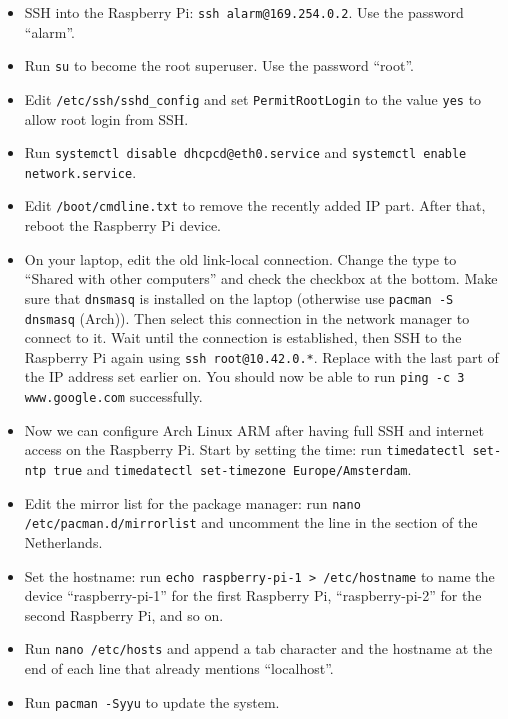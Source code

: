 \documentclass{article}
\newcommand{\arch}{{\color{red} (Arch)}}
\begin{document}
\begin{itemize}
          {\tt ifconfig} when you activate the connection. This is when the 
          connection is established.
    \item SSH into the Raspberry Pi: {\tt ssh alarm@169.254.0.2}. Use the 
          password ``alarm''.
    \item Run {\tt su} to become the root superuser. Use the password ``root''.
    \item Edit {\tt /etc/ssh/sshd\_config} and set {\tt PermitRootLogin} to the 
          value {\tt yes} to allow root login from SSH\@.
    \item Run {\tt systemctl disable dhcpcd@eth0.service} and {\tt systemctl 
          enable network.service}.
    \item Edit {\tt /boot/cmdline.txt} to remove the recently added IP part. 
          After that, reboot the Raspberry Pi device.
    \item On your laptop, edit the old link-local connection. Change the type 
          to ``Shared with other computers'' and check the checkbox at the 
          bottom. Make sure that {\tt dnsmasq} is installed on the laptop 
          (otherwise use {\tt pacman -S dnsmasq} \arch{}). Then select this 
          connection in the network manager to connect to it. Wait until the 
          connection is established, then SSH to the Raspberry Pi again using 
          {\tt ssh root@10.42.0.*}. Replace {\tt *} with the last part of the 
          IP address set earlier on. You should now be able to run {\tt ping -c 
          3 www.google.com} successfully.
    \item Now we can configure Arch Linux ARM after having full SSH and 
          internet access on the Raspberry Pi. Start by setting the time: run 
          {\tt timedatectl set-ntp true} and {\tt timedatectl set-timezone 
          Europe/Amsterdam}.
    \item Edit the mirror list for the package manager: run {\tt nano 
          /etc/pacman.d/mirrorlist} and uncomment the line in the section of 
          the Netherlands.
    \item Set the hostname: run {\tt echo raspberry-pi-1 > /etc/hostname} to 
          name the device ``raspberry-pi-1'' for the first Raspberry Pi, 
          ``raspberry-pi-2'' for the second Raspberry Pi, and so on.
    \item Run {\tt nano /etc/hosts} and append a tab character and the hostname 
          at the end of each line that already mentions ``localhost''.
    \item Run {\tt pacman -Syyu} to update the system.

\end{itemize}
\end{document}
